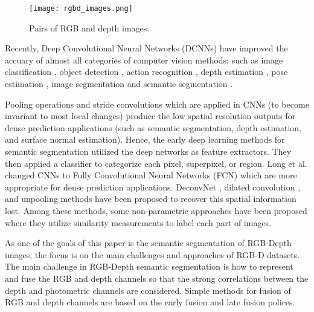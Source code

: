 \documentclass[journal,transmag]{IEEEtran}
\begin{document}
\begin{figure*}
	\begin{center}
		\texttt{[image: rgbd\_images.png]}
	\end{center}
	\caption{Pairs of RGB and depth images.}
	\label{fig:rgbimages}
\end{figure*}

Recently, Deep Convolutional Neural Networks (DCNNs) \cite{he2016deep, huang2017densely, simonyan2014very} have improved the accuary of almost all categories of computer vision methods; such as image classification \cite{krizhevsky2012imagenet, simonyan2014very, he2016deep}, object detection \cite{cadena2013semantic, ren2015faster}, action recognition \cite{wang2015action}, depth estimation \cite{liu2015deep, eigen2015predicting}, pose estimation \cite{kendall2015posenet} , image segmentation \cite{wang2019learning} and semantic segmentation \cite{long2015fully, chen2016deeplab, shi2018hierarchical, li2018joint}.  

Pooling operations and stride convolutions which are applied in CNNs (to become invariant to most local changes) produce the low spatial resolution outputs for dense prediction applications (such as semantic segmentation, depth estimation, and surface normal estimation). Hence, the early deep learning methods \cite{couprie2013indoor,farabet2013learning} for semantic segmentation utilized the deep networks as feature extractors. They then applied a classifier to categorize  each pixel, superpixel, or region. Long et al. \cite{long2015fully_jo} changed CNNs to Fully Convolutional Neural Networks (FCN) which are more appropriate for dense prediction applications. DeconvNet \cite{noh2015learning}, dilated convolution \cite{chen2018deeplab_j}, and unpooling \cite{badrinarayanan2017segnet_jo} methods have been proposed to recover this spatial information lost.  Among these methods, some non-parametric approaches \cite{khelifi2019mc, shuai2016scene} have been proposed where they utilize similarity measurements to label each part of images. 

As one of the goals of this paper is the semantic segmentation of RGB-Depth images, the focus is on the main challenges and approaches of RGB-D datasets. The main challenge in RGB-Depth semantic segmentation is how to represent and fuse the RGB and depth channels so that the strong correlations between the depth and photometric channels are considered. Simple methods for fusion of RGB and depth channels are based on the early fusion \cite{couprie2013indoor} and late fusion \cite{long2015fully} polices. 
\end{document}
